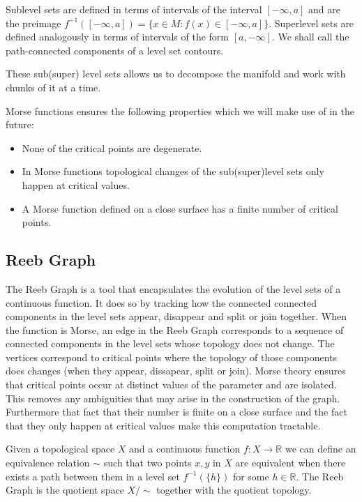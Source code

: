 Sublevel sets are defined in terms of intervals of the interval $[-\infty, a]$ and are the preimage $f^{-1}([-\infty, a]) = \{x \in M: f(x) \in [-\infty, a] \}$. Superlevel sets are defined analogously in terms of intervals of the form $[a, -\infty]$. We shall call the path-connected components of a level set contours.

These sub(super) level sets allows us to decompose the manifold and work with chunks of it at a time.

Morse functions ensures the following properties which we will make use of in the future:

\begin{itemize}
    \item None of the critical points are degenerate.
    \item In Morse functions topological changes of the sub(super)level sets only happen at critical values. 
    \item A Morse function defined on a close surface has a finite number of critical points.
\end{itemize}

\subsection{Reeb Graph}




The Reeb Graph is a tool that encapsulates the evolution of the level sets of a continuous function. It does so by tracking how the connected connected components in the level sets appear, disappear and split or join together. When the function is Morse, an edge in the Reeb Graph corresponds to a sequence of connected components in the level sets whose topology does not change. The vertices correspond to critical points where the topology of those components does changes (when they appear, dissapear, split or join). Morse theory ensures that critical points occur at distinct values of the parameter and are isolated. This removes any ambiguities that may arise in the construction of the graph. Furthermore that fact that their number is finite on a close surface and the fact that they only happen at critical values make this computation tractable.


\begin{defn}
Given a topological space $X$ and a continuous function $f: X \to \mathbb{R}$ we can define an equivalence relation $\sim$ such that two points $x, y$ in $X$ are equivalent when there exists a path between them in a level set $f^{-1}(\{h\})$ for some $h \in \mathbb{R}$. The Reeb Graph is the quotient space $X \big/ \sim$ together with the quotient topology.
\end{defn}

